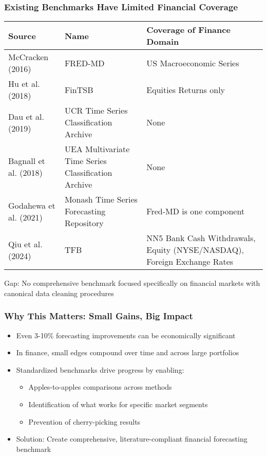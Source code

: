 \documentclass[ignorenonframetext, 9pt]{beamer}
\begin{document}
\begin{frame}
\frametitle{Existing Benchmarks Have Limited Financial Coverage}
\tiny
\begin{table}
\centering
\begin{tabular}{llp{4cm}}
\toprule
Source & Name & Coverage of Finance Domain \\
\midrule
McCracken (2016) & FRED-MD & US Macroeconomic Series \\
Hu et al. (2018) & FinTSB & Equities Returns only \\
Dau et al. (2019) & UCR Time Series Classification Archive & None \\
Bagnall et al. (2018) & UEA Multivariate Time Series Classification Archive & None \\
Godahewa et al. (2021) & Monash Time Series Forecasting Repository & Fred-MD is one component \\
Qiu et al. (2024) & TFB & NN5 Bank Cash Withdrawals, Equity (NYSE/NASDAQ), Foreign Exchange Rates \\
\bottomrule
\end{tabular}
\end{table}
\vspace{0.3cm}
\alert{Gap:} No comprehensive benchmark focused specifically on financial markets with canonical data cleaning procedures
\end{frame}

\begin{frame}
\frametitle{Why This Matters: Small Gains, Big Impact}
\begin{itemize}
\item Even 3-10\% forecasting improvements can be economically significant
\vspace{0.3cm}
\item In finance, small edges compound over time and across large portfolios
\vspace{0.3cm}
\item Standardized benchmarks drive progress by enabling:
\begin{itemize}
\item Apples-to-apples comparisons across methods
\item Identification of what works for specific market segments
\item Prevention of cherry-picking results
\end{itemize}
\vspace{0.3cm}
\item \alert{Solution}: Create comprehensive, literature-compliant financial forecasting benchmark
\end{itemize}
\end{frame}
\end{document}
